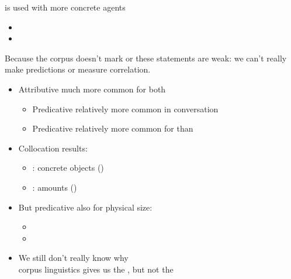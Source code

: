 \documentclass[a4paper,landscape,headrule,footrule,dvips]{foils}
\begin{document}
\begin{CJK}{UTF8}{min}
 is used with more concrete agents
\begin{itemize}
\item {}
\item {}
\end{itemize}

Because the corpus doesn't mark  or  these
statements are weak: we can't really make predictions or measure correlation.



\begin{itemize}
\item Attributive much more common for both
  \begin{itemize}
  \item Predicative relatively more common in conversation
  \item Predicative relatively more common for  than 
  \end{itemize}
\item Collocation results:
  \begin{itemize}
  \item {}: concrete objects ()
  \item {}: amounts  ()
  \end{itemize}
\item But predicative  also for physical size:
  \begin{itemize}
  \item {}
  \item {}
  \end{itemize}
\item We still don't really know why \frownie
 \\ corpus linguistics gives us the , but not the 
\end{itemize}





\end{CJK}
\end{document}
